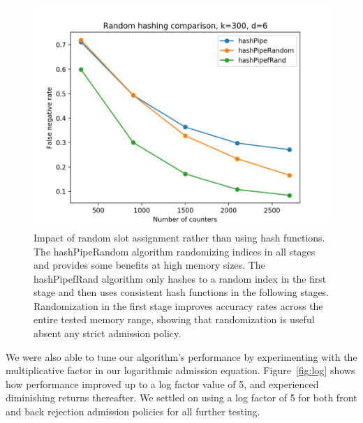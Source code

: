 \begin{figure}[!htb]
  \centering
    \includegraphics[scale=0.5]{random}
     \caption{Impact of random slot assignment rather than using hash functions. The hashPipeRandom algorithm randomizing indices in all stages and provides some benefits at high memory sizes. The hashPipefRand algorithm only hashes to a random index in the first stage and then uses consistent hash functions in the following stages. Randomization in the first stage improves accuracy rates across the entire tested memory range, showing that randomization is useful absent any strict admission policy.}
     \label{fig:random}
\end{figure}
We were also able to tune our algorithm's performance by experimenting with the multiplicative factor in our logarithmic admission equation. Figure~\ref{fig:log} shows how performance improved up to a log factor value of 5, and experienced diminishing returns thereafter. We settled on using a log factor of 5 for both front and back rejection admission policies for all further testing.
